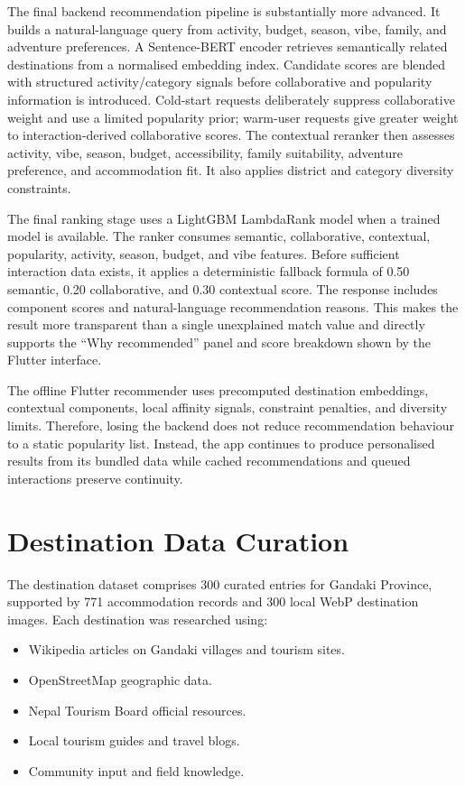\documentclass[12pt,a4paper,oneside]{report}
\begin{document}
The final backend recommendation pipeline is substantially more advanced. It builds a natural-language query from activity, budget, season, vibe, family, and adventure preferences. A Sentence-BERT encoder retrieves semantically related destinations from a normalised embedding index. Candidate scores are blended with structured activity/category signals before collaborative and popularity information is introduced. Cold-start requests deliberately suppress collaborative weight and use a limited popularity prior; warm-user requests give greater weight to interaction-derived collaborative scores. The contextual reranker then assesses activity, vibe, season, budget, accessibility, family suitability, adventure preference, and accommodation fit. It also applies district and category diversity constraints.

The final ranking stage uses a LightGBM LambdaRank model when a trained model is available. The ranker consumes semantic, collaborative, contextual, popularity, activity, season, budget, and vibe features. Before sufficient interaction data exists, it applies a deterministic fallback formula of 0.50 semantic, 0.20 collaborative, and 0.30 contextual score. The response includes component scores and natural-language recommendation reasons. This makes the result more transparent than a single unexplained match value and directly supports the ``Why recommended'' panel and score breakdown shown by the Flutter interface.

The offline Flutter recommender uses precomputed destination embeddings, contextual components, local affinity signals, constraint penalties, and diversity limits. Therefore, losing the backend does not reduce recommendation behaviour to a static popularity list. Instead, the app continues to produce personalised results from its bundled data while cached recommendations and queued interactions preserve continuity.

\section{Destination Data Curation}
\label{sec:data_curation}

The destination dataset comprises 300 curated entries for Gandaki Province, supported by 771 accommodation records and 300 local WebP destination images. Each destination was researched using:

\begin{itemize}
\item Wikipedia articles on Gandaki villages and tourism sites.
\item OpenStreetMap geographic data.
\item Nepal Tourism Board official resources.
\item Local tourism guides and travel blogs.
\item Community input and field knowledge.
\end{itemize}
\end{document}

